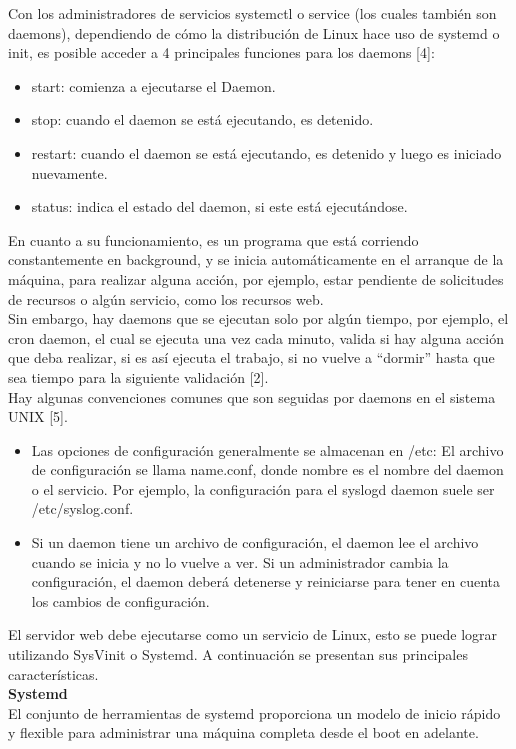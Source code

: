 \documentclass[conference]{IEEEtran}
\begin{document}
Con los administradores de servicios systemctl o service (los cuales también son daemons), dependiendo de cómo la distribución de Linux hace uso de systemd o init, es posible acceder a 4 principales funciones para los daemons [4]:
\begin{itemize}
    \item start: comienza a ejecutarse el Daemon.
    \item stop: cuando el daemon se está ejecutando, es detenido.
    \item restart: cuando el daemon se está ejecutando, es detenido y luego es iniciado nuevamente.
    \item status: indica el estado del daemon, si este está ejecutándose.
\end{itemize}
En cuanto a su funcionamiento, es un programa que está corriendo constantemente en background, y se inicia automáticamente en el arranque de la máquina, para realizar alguna acción, por ejemplo, estar pendiente de solicitudes de recursos o algún servicio, como los recursos web. 
\\Sin embargo, hay daemons que se ejecutan solo por algún tiempo, por ejemplo, el cron daemon, el cual se ejecuta una vez cada minuto, valida si hay alguna acción que deba realizar, si es así ejecuta el trabajo, si no vuelve a “dormir” hasta que sea tiempo para la siguiente validación [2].
\\Hay algunas convenciones comunes que son seguidas por daemons en el sistema UNIX [5].
\begin{itemize}
    \item Las opciones de configuración generalmente se almacenan en /etc: El archivo de configuración se llama name.conf, donde nombre es el nombre del daemon o el servicio. Por ejemplo, la configuración para el syslogd daemon suele ser /etc/syslog.conf.
    \item Si un daemon tiene un archivo de configuración, el daemon lee el archivo cuando se inicia y no lo vuelve a ver. Si un administrador cambia la configuración, el daemon deberá detenerse y reiniciarse para tener en cuenta los cambios de configuración. 
\end{itemize}
El servidor web debe ejecutarse como un servicio de Linux, esto se puede lograr utilizando SysVinit o Systemd. A continuación se presentan sus principales características.
\\\textbf{Systemd}
\\El conjunto de herramientas de systemd proporciona un modelo de inicio rápido y flexible para administrar una máquina completa desde el boot en adelante.
\end{document}
